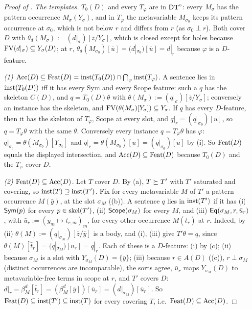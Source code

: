 \begin{proof}[Proof of ]
\emph{The templates.} $T_0(D)$ and every $T_\varphi$ are in $\mathrm{DT}^{\circ}$: every $M_\sigma$ has the pattern occurrence $M_\sigma(Y_\sigma)$, and in $T_\varphi$ the metavariable $M_{\sigma_0}$ keeps its pattern occurrence at $\sigma_0$, which is not below $r$ and differs from $r$ (as $\sigma_0\perp r$). Both cover $D$ with $\theta_d(M_\sigma):=(d|_\sigma)[\bar z/Y_\sigma]$, which is closed except for holes because $\mathrm{FV}(d|_\sigma)\subseteq Y_\sigma(D)$; at $r$, $\theta_d(M_{\sigma_0})[\bar u]=(d|_{\sigma_0})[\bar u]=d|_r$ because $\varphi$ is a $D$-feature.

\emph{(1) $\mathrm{Acc}(D)\subseteq\mathrm{Feat}(D)=\mathrm{inst}(T_0(D))\cap\bigcap_\varphi\mathrm{inst}(T_\varphi)$.} A sentence lies in $\mathrm{inst}(T_0(D))$ iff it has every Sym and every Scope feature: such a $q$ has the skeleton $C(D)$, and $q=T_0(D)\theta$ with $\theta(M_\sigma):=(q|_\sigma)[\bar z/Y_\sigma]$; conversely an instance has the skeleton, and $\mathrm{FV}(\theta(M_\sigma)[Y_\sigma])\subseteq Y_\sigma$. If $q$ has every $D$-feature, then it has the skeleton of $T_\varphi$, Scope at every slot, and $q|_r=(q|_{\sigma_0})[\bar u]$, so $q=T_\varphi\theta$ with the same $\theta$. Conversely every instance $q=T_\varphi\theta$ has $\varphi$: $q|_{\sigma_0}=\theta(M_{\sigma_0})[Y_{\sigma_0}]$ and $q|_r=\theta(M_{\sigma_0})[\bar u]=(q|_{\sigma_0})[\bar u]$ by (i). So $\mathrm{Feat}(D)$ equals the displayed intersection, and $\mathrm{Acc}(D)\subseteq\mathrm{Feat}(D)$ because $T_0(D)$ and the $T_\varphi$ cover $D$.

\emph{(2) $\mathrm{Feat}(D)\subseteq\mathrm{Acc}(D)$.} Let $T$ cover $D$. By (a), $T\succeq T'$ with $T'$ saturated and covering, so $\mathrm{inst}(T)\supseteq\mathrm{inst}(T')$. Fix for every metavariable $M$ of $T'$ a pattern occurrence $M(\bar y)$, at the slot $\sigma_M$ ((b)). A sentence $q$ lies in $\mathrm{inst}(T')$ if it has
(i) $\mathsf{Sym}(p)$ for every $p\in\mathrm{skel}(T')$,
(ii) $\mathsf{Scope}(\sigma_M)$ for every $M$, and
(iii) $\mathsf{Eq}(\sigma_M,r,\bar u_r)$, with $\bar u_r:=(y_m\mapsto t_{r,m})_m$, for every other occurrence $M(\bar t_r)$ at $r$.
Indeed, by (ii) $\theta(M):=(q|_{\sigma_M})[\bar z/\bar y]$ is a body, and (i), (iii) give $T'\theta=q$, since $\theta(M)[\bar t_r]=(q|_{\sigma_M})[\bar u_r]=q|_r$. Each of these is a $D$-feature: (i) by (c); (ii) because $\sigma_M$ is a slot with $Y_{\sigma_M}(D)=\{\bar y\}$; (iii) because $r\in A(D)$ ((c)), $r\perp\sigma_M$ (distinct occurrences are incomparable), the sorts agree, $\bar u_r$ maps $Y_{\sigma_M}(D)$ to metavariable-free terms in scope at $r$, and $T'$ covers $D$: $d|_r=\beta^d_M[\bar t_r]=(\beta^d_M[\bar y])[\bar u_r]=(d|_{\sigma_M})[\bar u_r]$. So $\mathrm{Feat}(D)\subseteq\mathrm{inst}(T')\subseteq\mathrm{inst}(T)$ for every covering $T$, i.e.\ $\mathrm{Feat}(D)\subseteq\mathrm{Acc}(D)$.
\end{proof}

